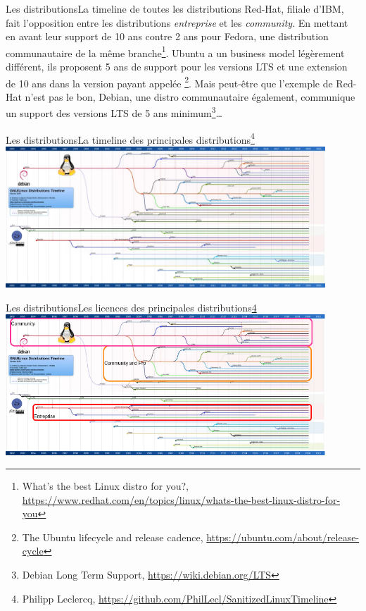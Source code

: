 \documentclass{beamer}
\begin{document}
    \begin{frame}{Les distributions}{La timeline de toutes les distributions}
        Red-Hat, filiale d'IBM, fait l'opposition entre les distributions \textit{entreprise} et les \textit{community}.
        En mettant en avant leur support de 10 ans contre 2 ans pour Fedora, une distribution communautaire de la même branche\footnote{What's the best Linux distro for you?, \url{https://www.redhat.com/en/topics/linux/whats-the-best-linux-distro-for-you}}.
        \bigbreak
        Ubuntu a un business model légèrement différent, ils proposent 5 ans de support pour les versions LTS et une extension de 10 ans dans la version payant appelée \footnote{The Ubuntu lifecycle and release cadence, \url{https://ubuntu.com/about/release-cycle}}.
        \bigbreak
        Mais peut-être que l'exemple de Red-Hat n'est pas le bon, Debian, une distro communautaire également, communique un support des versions LTS de 5 ans minimum\footnote{Debian Long Term Support, \url{https://wiki.debian.org/LTS}}\ldots
    \end{frame}

    \begin{frame}{Les distributions}{La timeline des principales distributions\footnote{\label{main-distro}Philipp Leclercq, \url{https://github.com/PhilLecl/SanitizedLinuxTimeline}}}
        \centering
        \includegraphics[width=12cm]{image/linux-main-distro-timeline}
    \end{frame}

    \begin{frame}{Les distributions}{Les licences des principales distributions\cref{main-distro}}
        \centering
        \includegraphics[width=12cm]{image/main-distro-license.drawio}
    \end{frame}
\end{document}
